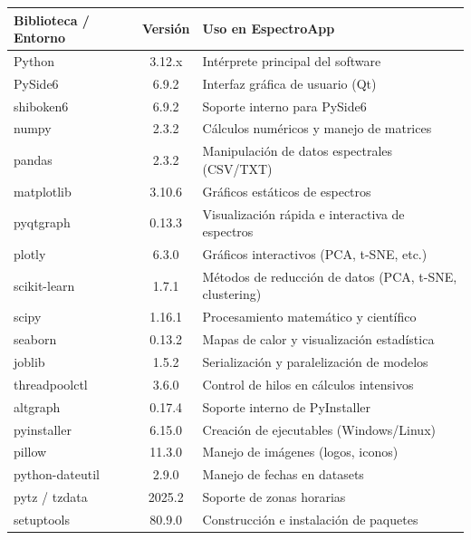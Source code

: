 \documentclass[12pt]{article}
\begin{document}
    \begin{table}[H]
    \centering
    \renewcommand{\arraystretch}{1.2}
    \begin{tabular}{|l|c|p{7cm}|}
    \hline
    \textbf{Biblioteca / Entorno} & \textbf{Versión} & \textbf{Uso en EspectroApp} \\
    \hline
    Python          & 3.12.x   & Intérprete principal del software \\
    PySide6         & 6.9.2    & Interfaz gráfica de usuario (Qt) \\
    shiboken6       & 6.9.2    & Soporte interno para PySide6 \\
    numpy           & 2.3.2    & Cálculos numéricos y manejo de matrices \\
    pandas          & 2.3.2    & Manipulación de datos espectrales (CSV/TXT) \\
    matplotlib      & 3.10.6   & Gráficos estáticos de espectros \\
    pyqtgraph       & 0.13.3   & Visualización rápida e interactiva de espectros \\
    plotly          & 6.3.0    & Gráficos interactivos (PCA, t-SNE, etc.) \\
    scikit-learn    & 1.7.1    & Métodos de reducción de datos (PCA, t-SNE, clustering) \\
    scipy           & 1.16.1   & Procesamiento matemático y científico \\
    seaborn         & 0.13.2   & Mapas de calor y visualización estadística \\
    joblib          & 1.5.2    & Serialización y paralelización de modelos \\
    threadpoolctl   & 3.6.0    & Control de hilos en cálculos intensivos \\
    altgraph        & 0.17.4   & Soporte interno de PyInstaller \\
    pyinstaller     & 6.15.0   & Creación de ejecutables (Windows/Linux) \\
    pillow          & 11.3.0   & Manejo de imágenes (logos, iconos) \\
    python-dateutil & 2.9.0    & Manejo de fechas en datasets \\
    pytz / tzdata   & 2025.2   & Soporte de zonas horarias \\
    setuptools      & 80.9.0   & Construcción e instalación de paquetes \\
    \hline
    \end{tabular}
    \end{table}
\end{document}

